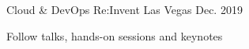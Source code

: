 \begin{cventries}
  \cventry
    {Cloud \& DevOps} %
    {Re:Invent} %
    {Las Vegas} %
    {Dec. 2019} %
    {
      \begin{cvitems} %
        \item {Follow talks, hands-on sessions and keynotes}
      \end{cvitems}
    }

\end{cventries}
